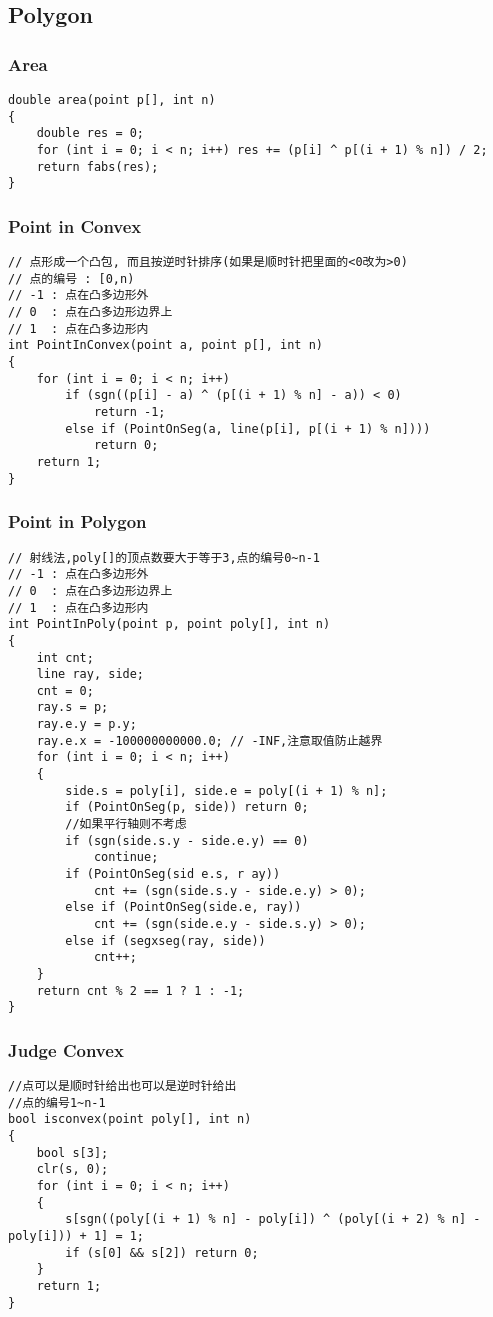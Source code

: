 \documentclass[twoside]{article}
\begin{document}
\subsection{Polygon}
\subsubsection{Area}
\begin{lstlisting}
double area(point p[], int n)
{
    double res = 0;
    for (int i = 0; i < n; i++) res += (p[i] ^ p[(i + 1) % n]) / 2;
    return fabs(res);
}
\end{lstlisting}
\subsubsection{Point in Convex}
\begin{lstlisting}
// 点形成一个凸包, 而且按逆时针排序(如果是顺时针把里面的<0改为>0)
// 点的编号 : [0,n)
// -1 : 点在凸多边形外
// 0  : 点在凸多边形边界上
// 1  : 点在凸多边形内
int PointInConvex(point a, point p[], int n)
{
    for (int i = 0; i < n; i++)
        if (sgn((p[i] - a) ^ (p[(i + 1) % n] - a)) < 0)
            return -1;
        else if (PointOnSeg(a, line(p[i], p[(i + 1) % n])))
            return 0;
    return 1;
}
\end{lstlisting}
\subsubsection{Point in Polygon}
\begin{lstlisting}
// 射线法,poly[]的顶点数要大于等于3,点的编号0~n-1
// -1 : 点在凸多边形外
// 0  : 点在凸多边形边界上
// 1  : 点在凸多边形内
int PointInPoly(point p, point poly[], int n)
{
    int cnt;
    line ray, side;
    cnt = 0;
    ray.s = p;
    ray.e.y = p.y;
    ray.e.x = -100000000000.0; // -INF,注意取值防止越界
    for (int i = 0; i < n; i++)
    {
        side.s = poly[i], side.e = poly[(i + 1) % n];
        if (PointOnSeg(p, side)) return 0;
        //如果平行轴则不考虑
        if (sgn(side.s.y - side.e.y) == 0)
            continue;
        if (PointOnSeg(sid e.s, r ay))
            cnt += (sgn(side.s.y - side.e.y) > 0);
        else if (PointOnSeg(side.e, ray))
            cnt += (sgn(side.e.y - side.s.y) > 0);
        else if (segxseg(ray, side))
            cnt++;
    }
    return cnt % 2 == 1 ? 1 : -1;
}
\end{lstlisting}
\subsubsection{Judge Convex}
\begin{lstlisting}
//点可以是顺时针给出也可以是逆时针给出
//点的编号1~n-1
bool isconvex(point poly[], int n)
{
    bool s[3];
    clr(s, 0);
    for (int i = 0; i < n; i++)
    {
        s[sgn((poly[(i + 1) % n] - poly[i]) ^ (poly[(i + 2) % n] - poly[i])) + 1] = 1;
        if (s[0] && s[2]) return 0;
    }
    return 1;
}
\end{lstlisting}
\end{document}
